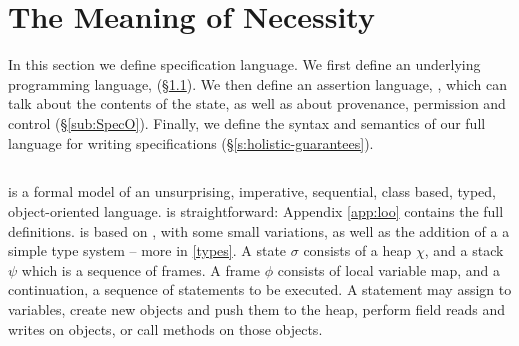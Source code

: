 \section{The Meaning of Necessity}
\label{s:semantics}

 
In this section we define   \Nec specification language.  
We first
define an underlying programming language, \Loo (\S \ref{sub:Loo}).
We then define an assertion language, \SpecO, which can talk about the
contents of the state, as well as about provenance, permission and
control (\S \ref{sub:SpecO}).  Finally, we define the syntax and
semantics of our full language for writing \Nec
specifications (\S \ref{s:holistic-guarantees}).


\subsection{\Loo}
\label{sub:Loo} 
 \Loo is a formal model of an unsurprising, imperative, sequential, 
class based, typed, object-oriented language.
\Loo is straightforward:
Appendix \ref{app:loo} contains 
the full definitions.
\Loo is based on \LangOO 
\cite{FASE}, with some small variations, as well as 
the addition of a %
 a simple type system -- more in \ref{types}.
%
%
A \Loo state $\sigma$ consists of a 
heap $\chi$, and a  {stack $\psi$ which is a sequence of frames}.
A frame $\phi$ consists of
local variable map, and a continuation, \ie a sequence of statements to be executed.
 A statement may assign to variables, create new objects and push them to the heap, 
perform field reads and writes on objects,  or
 call methods on those objects. 

